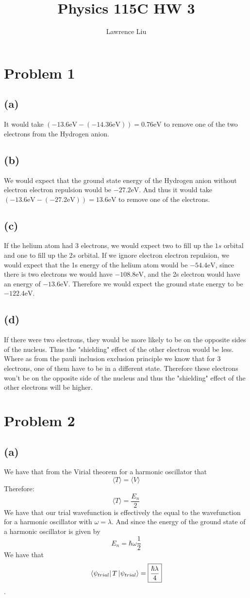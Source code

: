 \documentclass[11pt]{article}
\author{Lawrence Liu}
\title{Physics 115C HW 3}
\begin{document}
\maketitle
\section*{Problem 1}
\subsection*{(a)}
It would take $(-13.6\text{eV} - (-14.36 \text{eV})) = 0.76\text{eV}$ to remove one of the 
two electrons from the Hydrogen anion.
\subsection*{(b)}
We would expect that the ground state energy of the Hydrogen anion without
electron electron repulsion would be $-27.2\text{eV}$. And thus it would take 
$(-13.6\text{eV} - (-27.2 \text{eV})) = 13.6\text{eV}$ to remove one of the
electrons.
\subsection*{(c)}
If the helium atom had 3 electrons, we would expect two to fill up the 
$1s$ orbital and one to fill up the $2s$ orbital. If we ignore
electron electron repulsion, we would expect that the 1s energy 
of the helium atom would be $-54.4\text{eV}$, since there is 
two electrons we would have $-108.8\text{eV}$, and the
2s electron would have an energy of $-13.6\text{eV}$. Therefore
we would expect the ground state energy to be 
$-122.4\text{eV}$.
\subsection*{(d)}
If there were two electrons, they would be more likely to be on the 
opposite sides of the nucleus. Thus the "shielding" effect of the 
other electron would be less. Where as from the pauli inclusion 
exclusion principle we know that for 3 electrons, one of them have 
to be in a different state. Therefore these electrons won't be on the opposite
side of the nucleus and thus the "shielding" effect of the other electrons will be higher.
\section*{Problem 2}
\subsection*{(a)}
We have that from the Virial theorem for a 
harmonic oscillator that
$$\langle T\rangle = \langle V\rangle$$
Therefore:
$$\langle T \rangle =  \frac{E_n}{2}$$
We have that our trial wavefunction is effectively the 
equal to the wavefunction for a harmonic oscillator with
$\omega=\lambda$. And since the energy of the ground state of a 
harmonic oscillator is given by
$$E_n = \hbar\omega\frac{1}{2}$$
We have that
$$\bra{\psi_{trial}}T\ket{\psi_{trial}} = \boxed{\frac{\hbar\lambda}{4}}$$.
\end{document}
